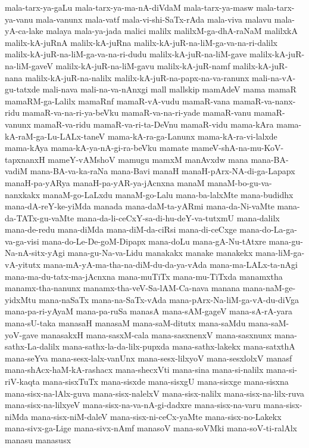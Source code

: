 {mala-tarx-ya-gaLu
mala-tarx-ya-ma-nA-diVdaM
mala-tarx-ya-masw
mala-tarx-ya-vanu
mala-vanunx
mala-vatf
mala-vi-shi-SaTx-rAda
mala-viva
malavu
mala-yA-ca-lake
malaya
mala-ya-jada
malici
malilx
malilxM-ga-dhA-raNaM
malilxkA
malilx-kA-juRnA
malilx-kA-juRna
malilx-kA-juR-na-liM-ga-va-na-ri-dalilx
malilx-kA-juR-na-liM-ga-va-na-ri-dudu
malilx-kA-juR-na-liM-gave
malilx-kA-juR-na-liM-gaveV
malilx-kA-juR-na-liM-gavu
malilx-kA-juR-namf
malilx-kA-juR-nana
malilx-kA-juR-na-nalilx
malilx-kA-juR-na-papx-na-va-ranunx
mali-na-vA-gu-tatxde
mali-nava
mali-na-va-nAnxgi
mall
mallskip
mamAdeV
mama
mamaR
mamaRM-ga-Lalilx
mamaRnf
mamaR-vA-vudu
mamaR-vana
mamaR-va-nanx-ridu
mamaR-va-na-ri-ya-beVku
mamaR-va-na-ri-yade
mamaR-vanu
mamaR-vanunx
mamaR-va-ridu
mamaR-va-ri-ta-DeVnu
mamaR-vidu
mama-kAra
mama-kA-raM-ga-Lu-LALx-taneV
mama-kA-ra-ga-Lanunx
mama-kA-ra-vi-lalxde
mama-kAya
mama-kA-ya-nA-gi-ra-beVku
mamate
mameV-shA-na-mu-KoV-tapxnanxH
mameY-vAMshoV
mamugu
mamxM
manAvxdw
mana
mana-BA-vadiM
mana-BA-va-ka-raNa
mana-Bavi
manaH
manaH-pArx-NA-di-ga-Lapapx
manaH-pa-yARya
manaH-pa-yAR-ya-jAcnxna
manaM
manaM-bo-gu-va-nanxkakx
manaM-go-LaLxdu
manaM-go-Lalu
mana-ba-lalxMte
mana-budidhx
mana-dA-reY-ke-yiMda
manada
mana-daM-ta-yARmi
mana-da-Ni-vaMte
mana-da-TATx-gu-vaMte
mana-da-li-ceCxY-sa-di-hu-deY-va-tutxmU
mana-dalilx
mana-de-redu
mana-diMda
mana-diM-da-ciRsi
mana-di-ceCxge
mana-do-La-ga-va-ga-visi
mana-do-Le-De-goM-Dipapx
mana-doLu
mana-gA-Nu-tAtxre
mana-gu-Na-nA-sitx-yAgi
mana-gu-Na-va-Lidu
manakakx
manake
manakekx
mana-liM-ga-vA-yitutx
mana-mA-yA-ma-tha-na-diM-du-da-ya-vAda
mana-ma-LALx-ta-nAgi
mana-ma-du-tatx-ma-jAcnxna
mana-muTiTx
mana-mu-TiTxda
manamxtha
manamx-tha-nanunx
manamx-tha-veV-Sa-lAM-Ca-nava
manana
mana-naM-ge-yidxMtu
mana-naSaTx
mana-na-SaTx-vAda
mana-pArx-Na-liM-ga-vA-du-diVga
mana-pa-ri-yAyaM
mana-pa-ruSa
manasA
mana-sAM-gageV
mana-sA-rA-yara
mana-sU-taka
manasaH
manasaM
mana-saM-ditutx
mana-saMdu
mana-saM-yoV-gave
manasakxH
mana-sasxM-cala
mana-sasxnenxV
mana-sasxnunx
mana-sathx-La-dalilx
mana-sathx-la-da-lilx-pupxda
mana-sathx-lakekx
mana-satxthA
mana-seYva
mana-sesx-lalx-vanUnx
mana-sesx-lilxyoV
mana-sesxlolxV
manasf
mana-shAcx-haM-kA-rashacx
mana-shecxVti
mana-sina
mana-si-nalilx
mana-si-riV-kaqta
mana-sisxTuTx
mana-sisxde
mana-sisxgU
mana-sisxge
mana-sisxna
mana-sisx-na-lAlx-guva
mana-sisx-nalelxV
mana-sisx-nalilx
mana-sisx-na-lilx-ruva
mana-sisx-na-lilxyeV
mana-sisx-na-va-nA-gi-dadxre
mana-sisx-na-varu
mana-sisx-niMda
mana-sisx-niM-daleV
mana-sisx-ni-ceCx-yaMte
mana-sisx-no-Lakekx
mana-sivx-ga-Lige
mana-sivx-nAmf
manasoV
mana-soVMki
mana-soV-ti-ralAlx
manasu
manasusx
}
